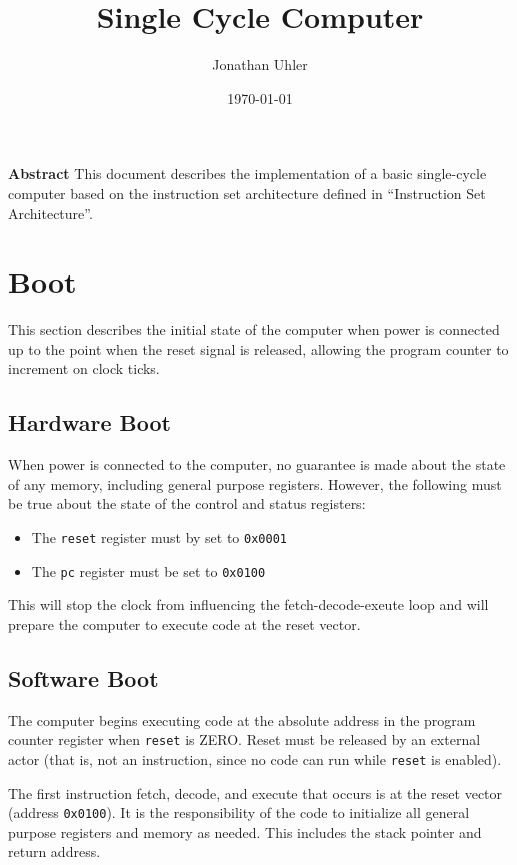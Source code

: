 \documentclass{article}
\begin{document}
\title{Single Cycle Computer}
\author{Jonathan Uhler}
\date{\today}
\maketitle

\textbf{Abstract}
This document describes the implementation of a basic single-cycle computer based on the instruction
set architecture defined in ``Instruction Set Architecture''.
\pagebreak


\section{Boot}
This section describes the initial state of the computer when power is connected up to the point
when the reset signal is released, allowing the program counter to increment on clock ticks.

\subsection{Hardware Boot}
When power is connected to the computer, no guarantee is made about the state of any memory,
including general purpose registers. However, the following must be true about the state of the
control and status registers:

\begin{itemize}
\item The \verb|reset| register must by set to \verb|0x0001|
\item The \verb|pc| register must be set to \verb|0x0100|
\end{itemize}

This will stop the clock from influencing the fetch-decode-exeute loop and will prepare the computer
to execute code at the reset vector.

\subsection{Software Boot}
The computer begins executing code at the absolute address in the program counter register when
\verb|reset| is ZERO. Reset must be released by an external actor (that is, not an instruction,
since no code can run while \verb|reset| is enabled).

The first instruction fetch, decode, and execute that occurs is at the reset vector (address
\verb|0x0100|). It is the responsibility of the code to initialize all general purpose registers and
memory as needed. This includes the stack pointer and return address.
\end{document}
